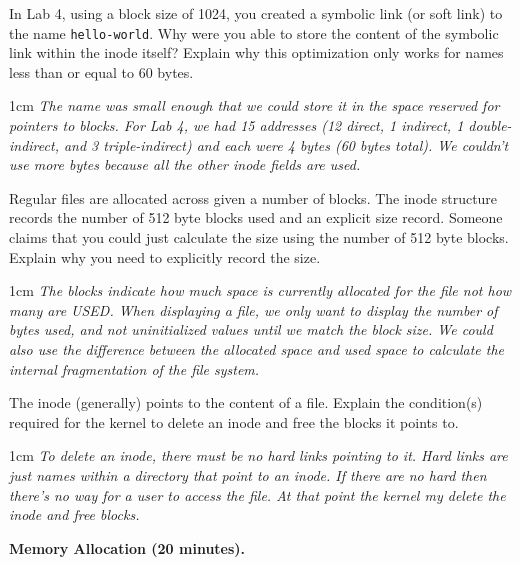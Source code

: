 \documentclass[12pt]{article}
\newenvironment{answer}{\begin{adjustwidth}{1cm}{}\itshape}{\end{adjustwidth}}
\begin{document}
In Lab 4, using a block size of 1024, you created a symbolic link (or soft link)
to the name \texttt{hello-world}.
Why were you able to store the content of the symbolic link within the inode itself?
Explain why this optimization only works for names less than or equal to 60 bytes.

\begin{answer}
  The name was small enough that we could store it in the space reserved for
  pointers to blocks. For Lab 4, we had 15 addresses (12 direct, 1 indirect, 1
  double-indirect, and 3 triple-indirect) and each were 4 bytes (60 bytes
  total). We couldn't use more bytes because all the other inode fields are
  used.
\end{answer}

\vspace{1em}

Regular files are allocated across given a number of blocks. The inode
structure records the number of 512 byte blocks used and an explicit size record.
Someone claims that you could just calculate the size using the number of 512 byte
blocks. Explain why you need to explicitly record the size.

\begin{answer}
  The blocks indicate how much space is currently allocated for the file not how
  many are USED. When displaying a file, we only want to display the number of
  bytes used, and not uninitialized values until we match the block size.
  We could also use the difference between the allocated space and used space to
  calculate the internal fragmentation of the file system.
\end{answer}

\vspace{1em}

The inode (generally) points to the content of a file.
Explain the condition(s) required for the kernel to delete an inode and free the blocks
it points to.

\begin{answer}
  To delete an inode, there must be no hard links pointing to it. Hard links are
  just names within a directory that point to an inode. If there are no hard
  then there's no way for a user to access the file. At that point the kernel
  my delete the inode and free blocks.
\end{answer}

\newpage

\textbf{Memory Allocation (20 minutes).}

\vspace{1em}
\end{document}
